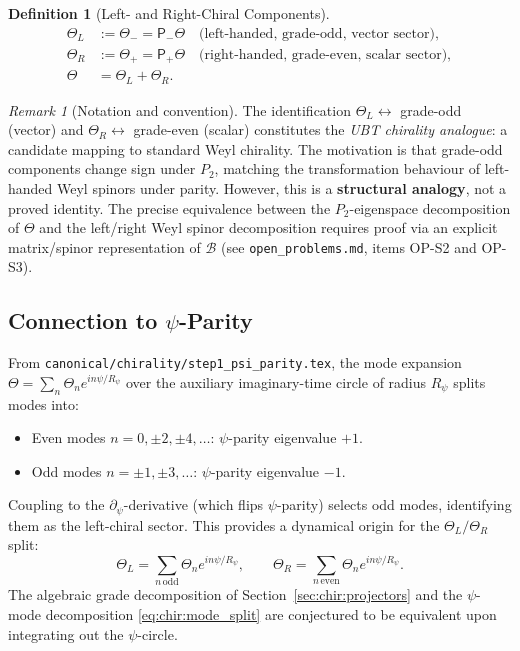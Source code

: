 \documentclass[12pt,a4paper]{article}
\theoremstyle{definition}
\newtheorem{definition}[theorem]{Definition}
\theoremstyle{remark}
\newtheorem{remark}[theorem]{Remark}
\begin{document}
\begin{definition}[Left- and Right-Chiral Components]
\label{def:chir:LR}
\begin{align}
  \Theta_L &:= \Theta_- = \mathsf{P}_-\Theta
  \quad \text{(left-handed, grade-odd, vector sector)}, \\
  \Theta_R &:= \Theta_+ = \mathsf{P}_+\Theta
  \quad \text{(right-handed, grade-even, scalar sector)}, \\
  \Theta   &= \Theta_L + \Theta_R.
\end{align}
\end{definition}

\begin{remark}[Notation and convention]
The identification $\Theta_L \leftrightarrow$ grade-odd (vector) and
$\Theta_R \leftrightarrow$ grade-even (scalar) constitutes the
\emph{UBT chirality analogue}: a candidate mapping to standard Weyl
chirality.  The motivation is that grade-odd components change sign under
$P_2$, matching the transformation behaviour of left-handed Weyl spinors
under parity.  However, this is a \textbf{structural analogy}, not a
proved identity.  The precise equivalence between the $P_2$-eigenspace
decomposition of $\Theta$ and the left/right Weyl spinor decomposition
requires proof via an explicit matrix/spinor representation of $\mathcal{B}$
(see \texttt{open\_problems.md}, items OP-S2 and OP-S3).
\end{remark}

\subsection{Connection to $\psi$-Parity}
\label{sec:chir:psi_parity}

From \texttt{canonical/chirality/step1\_psi\_parity.tex}, the mode expansion
$\Theta = \sum_n \Theta_n e^{in\psi/R_\psi}$ over the auxiliary imaginary-time
circle of radius $R_\psi$ splits modes into:
\begin{itemize}
  \item Even modes $n=0,\pm2,\pm4,\ldots$: $\psi$-parity eigenvalue $+1$.
  \item Odd modes $n=\pm1,\pm3,\ldots$: $\psi$-parity eigenvalue $-1$.
\end{itemize}
Coupling to the $\partial_\psi$-derivative (which flips $\psi$-parity)
selects odd modes, identifying them as the left-chiral sector.
This provides a dynamical origin for the $\Theta_L/\Theta_R$ split:
\begin{equation}
  \Theta_L = \sum_{n\,\mathrm{odd}} \Theta_n e^{in\psi/R_\psi},
  \qquad
  \Theta_R = \sum_{n\,\mathrm{even}} \Theta_n e^{in\psi/R_\psi}.
  \label{eq:chir:mode_split}
\end{equation}
The algebraic grade decomposition of Section~\ref{sec:chir:projectors} and
the $\psi$-mode decomposition \eqref{eq:chir:mode_split} are conjectured to
be equivalent upon integrating out the $\psi$-circle.
\end{document}
